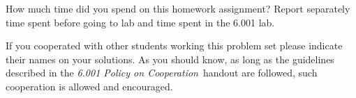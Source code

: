 \vspace{6ex}

How much time did you spend on this homework assignment? Report separately
time spent before going to lab and time spent in the 6.001 lab.

\vspace{6ex}

If you cooperated with other students working this problem set
please indicate their names on your solutions. As you should know,
as long as the guidelines described in the 
{\em 6.001 Policy on Cooperation}\ handout are followed,
such cooperation is allowed and encouraged.





